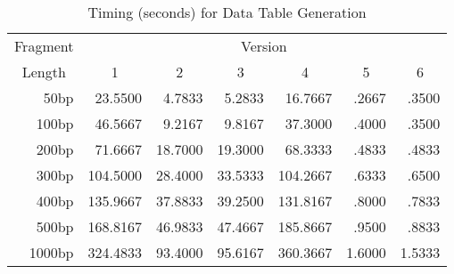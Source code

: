 \begin{table}[bth]
\caption{Timing (seconds) for Data Table Generation}
\label{'table1'}
\begin{center}
\begin{tabular}{||r|rrrrrr||}  \hline
\multicolumn{1}{||c|}{Fragment} & \multicolumn{6}{c||}{Version} \\ 
\multicolumn{1}{||c|}{Length} & \multicolumn{1}{c}{1} & \multicolumn{1}{c}{2} &
\multicolumn{1}{c}{3} & \multicolumn{1}{c}{4} & \multicolumn{1}{c}{5} &
\multicolumn{1}{c||}{6} \\ \hline
50bp   &  23.5500 &  4.7833 &  5.2833 &  16.7667 &  .2667 &  .3500 \\
100bp  &  46.5667 &  9.2167 &  9.8167 &  37.3000 &  .4000 &  .3500 \\
200bp  &  71.6667 & 18.7000 & 19.3000 &  68.3333 &  .4833 &  .4833 \\
300bp  & 104.5000 & 28.4000 & 33.5333 & 104.2667 &  .6333 &  .6500 \\
400bp  & 135.9667 & 37.8833 & 39.2500 & 131.8167 &  .8000 &  .7833 \\
500bp  & 168.8167 & 46.9833 & 47.4667 & 185.8667 &  .9500 &  .8833 \\
1000bp & 324.4833 & 93.4000 & 95.6167 & 360.3667 & 1.6000 & 1.5333 \\ \hline
\end{tabular}
\end{center}
\end{table}
